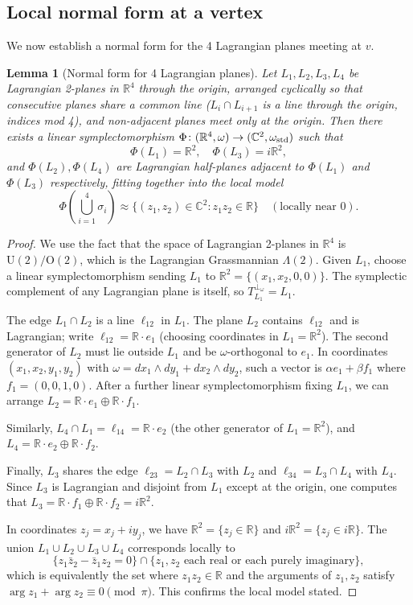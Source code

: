 \documentclass[12pt]{article}
\newtheorem{lemma}[theorem]{Lemma}
\newcommand{\bR}{\mathbb{R}}
\newcommand{\bC}{\mathbb{C}}
\newcommand{\om}{\omega}
\begin{document}
\subsection{Local normal form at a vertex}

We now establish a normal form for the 4 Lagrangian planes meeting at $v$.

\begin{lemma}[Normal form for 4 Lagrangian planes]
\label{lem:normal-form}
Let $L_1, L_2, L_3, L_4$ be Lagrangian 2-planes in $\bR^4$ through the origin, arranged cyclically so that consecutive planes share a common line ($L_i \cap L_{i+1}$ is a line through the origin, indices mod 4), and non-adjacent planes meet only at the origin. Then there exists a linear symplectomorphism $\Phi \colon (\bR^4, \om) \to (\bC^2, \om_{\rm std})$ such that
\[
  \Phi(L_1) = \bR^2,\quad
  \Phi(L_3) = i\bR^2,
\]
and $\Phi(L_2), \Phi(L_4)$ are Lagrangian half-planes adjacent to $\Phi(L_1)$ and $\Phi(L_3)$ respectively, fitting together into the local model
\[
  \Phi\!\left(\bigcup_{i=1}^4 \sigma_i\right) \approx \{(z_1, z_2) \in \bC^2 : z_1 z_2 \in \bR\} \quad (\text{locally near }0).
\]
\end{lemma}

\begin{proof}
We use the fact that the space of Lagrangian 2-planes in $\bR^4$ is $\mathrm{U}(2)/\mathrm{O}(2)$, which is the Lagrangian Grassmannian $\Lambda(2)$. Given $L_1$, choose a linear symplectomorphism sending $L_1$ to $\bR^2 = \{(x_1,x_2,0,0)\}$. The symplectic complement of any Lagrangian plane is itself, so $T_{L_1}^{\perp_\om} = L_1$.

The edge $L_1 \cap L_2$ is a line $\ell_{12}$ in $L_1$. The plane $L_2$ contains $\ell_{12}$ and is Lagrangian; write $\ell_{12} = \bR \cdot e_1$ (choosing coordinates in $L_1 = \bR^2$). The second generator of $L_2$ must lie outside $L_1$ and be $\om$-orthogonal to $e_1$. In coordinates $(x_1, x_2, y_1, y_2)$ with $\om = dx_1 \wedge dy_1 + dx_2 \wedge dy_2$, such a vector is $\alpha e_1 + \beta f_1$ where $f_1 = (0,0,1,0)$. After a further linear symplectomorphism fixing $L_1$, we can arrange $L_2 = \bR \cdot e_1 \oplus \bR \cdot f_1$.

Similarly, $L_4 \cap L_1 = \ell_{14} = \bR \cdot e_2$ (the other generator of $L_1 = \bR^2$), and $L_4 = \bR \cdot e_2 \oplus \bR \cdot f_2$.

Finally, $L_3$ shares the edge $\ell_{23} = L_2 \cap L_3$ with $L_2$ and $\ell_{34} = L_3 \cap L_4$ with $L_4$. Since $L_3$ is Lagrangian and disjoint from $L_1$ except at the origin, one computes that $L_3 = \bR \cdot f_1 \oplus \bR \cdot f_2 = i\bR^2$.

In coordinates $z_j = x_j + iy_j$, we have $\bR^2 = \{z_j \in \bR\}$ and $i\bR^2 = \{z_j \in i\bR\}$. The union $L_1 \cup L_2 \cup L_3 \cup L_4$ corresponds locally to
\[
  \{z_1 \bar{z}_2 - \bar{z}_1 z_2 = 0\} \cap \{z_1,z_2 \text{ each real or each purely imaginary}\},
\]
which is equivalently the set where $z_1 z_2 \in \bR$ and the arguments of $z_1,z_2$ satisfy $\arg z_1 + \arg z_2 \equiv 0 \pmod{\pi}$. This confirms the local model stated.
\end{proof}
\end{document}
